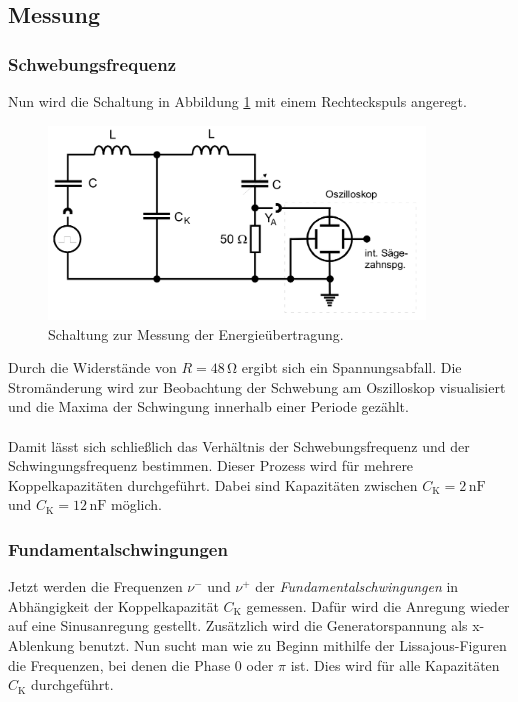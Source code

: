 \subsection{Messung}
\subsubsection*{Schwebungsfrequenz}

Nun wird die Schaltung in Abbildung \ref{fig:schwebeschaltung} mit einem Rechteckspuls angeregt.

\begin{figure} [H]
    \centering
    \includegraphics[width=10cm] {pictures/schwebeschaltung.png} 
    \caption{Schaltung zur Messung der Energieübertragung. \cite{v355}}
    \label{fig:schwebeschaltung}
\end{figure} 

Durch die Widerstände von $R = 48 \,\unit{\ohm}$ ergibt sich ein Spannungsabfall.
Die Stromänderung wird zur Beobachtung der Schwebung am Oszilloskop visualisiert und
die Maxima der Schwingung innerhalb einer Periode gezählt.\\
\\
Damit lässt sich schließlich das Verhältnis der Schwebungsfrequenz und der Schwingungsfrequenz bestimmen.
Dieser Prozess wird für mehrere Koppelkapazitäten durchgeführt.
Dabei sind Kapazitäten zwischen $C_{\text{K}} = 2 \,\unit{\nano\farad}$ und $C_{\text{K}} = 12 \,\unit{\nano\farad}$ möglich.

\subsubsection*{Fundamentalschwingungen}

Jetzt werden die Frequenzen $\nu^{-}$ und $\nu^{+}$ der \textit{Fundamentalschwingungen} in 
Abhängigkeit der Koppelkapazität $C_{\text{K}}$ gemessen.
Dafür wird die Anregung wieder auf eine Sinusanregung gestellt.
Zusätzlich wird die Generatorspannung als x-Ablenkung benutzt.
Nun sucht man wie zu Beginn mithilfe der Lissajous-Figuren die Frequenzen, bei denen die Phase 0 oder $\pi$ ist.
Dies wird für alle Kapazitäten $C_{\text{K}}$ durchgeführt.

